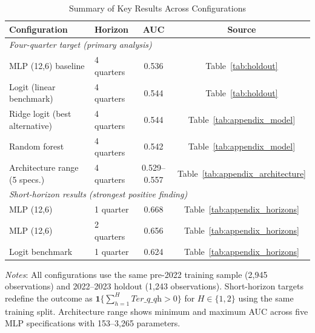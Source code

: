 \documentclass[12pt]{article}
\begin{document}
\bigskip

\begin{table}[H]
\centering
\caption{Summary of Key Results Across Configurations}\label{tab:summary}
\begin{threeparttable}
\small
\begin{tabular}{llcc}
\toprule
Configuration & Horizon & AUC & Source \\
\midrule
\multicolumn{4}{l}{\textit{Four-quarter target (primary analysis)}} \\
MLP (12,6) baseline          & 4 quarters & 0.536 & Table~\ref{tab:holdout} \\
Logit (linear benchmark)     & 4 quarters & 0.544 & Table~\ref{tab:holdout} \\
Ridge logit (best alternative)& 4 quarters & 0.544 & Table~\ref{tab:appendix_model} \\
Random forest                & 4 quarters & 0.542 & Table~\ref{tab:appendix_model} \\
Architecture range (5 specs.)& 4 quarters & 0.529--0.557 & Table~\ref{tab:appendix_architecture} \\
\midrule
\multicolumn{4}{l}{\textit{Short-horizon results (strongest positive finding)}} \\
MLP (12,6)                   & 1 quarter  & 0.668 & Table~\ref{tab:appendix_horizons} \\
MLP (12,6)                   & 2 quarters & 0.656 & Table~\ref{tab:appendix_horizons} \\
Logit benchmark              & 1 quarter  & 0.624 & Table~\ref{tab:appendix_horizons} \\
\bottomrule
\end{tabular}
\begin{tablenotes}
  \small
  \item \textit{Notes}: All configurations use the same pre-2022 training
  sample (2,945 observations) and 2022--2023 holdout (1,243 observations).
  Short-horizon targets redefine the outcome as $\mathbf{1}\{\sum_{h=1}^{H}
  \textit{Ter\_q\_qh}>0\}$ for $H\in\{1,2\}$ using the same training split.
  Architecture range shows minimum and maximum AUC across five MLP
  specifications with 153--3,265 parameters.
\end{tablenotes}
\end{threeparttable}
\end{table}

\newpage
\end{document}
